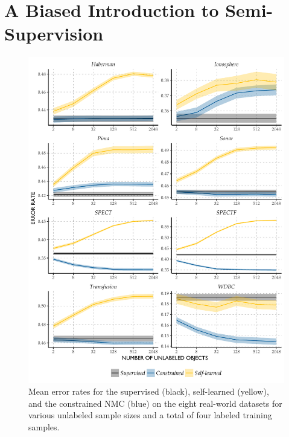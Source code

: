 \documentclass[twoside]{memoir}\usepackage[]{graphicx}\usepackage{xcolor}
\makeatletter
\def\maxwidth{ %
  \ifdim\Gin@nat@width>\linewidth
    \linewidth
  \else
    \Gin@nat@width
  \fi
}
\newenvironment{knitrout}{}{} %
\makeatother
\begin{document}
\section{A Biased Introduction to Semi-Supervision}

\begin{knitrout}
\color{fgcolor}\begin{figure}
\includegraphics[width=\maxwidth]{figure/one-1} \caption[Mean error rates for the supervised (black), self-learned (yellow), and the constrained NMC (blue) on the eight real-world datasets for various unlabeled sample sizes and a total of four labeled training samples]{Mean error rates for the supervised (black), self-learned (yellow), and the constrained NMC (blue) on the eight real-world datasets for various unlabeled sample sizes and a total of four labeled training samples.}\label{fig:one}
\end{figure}


\end{knitrout}
\end{document}
